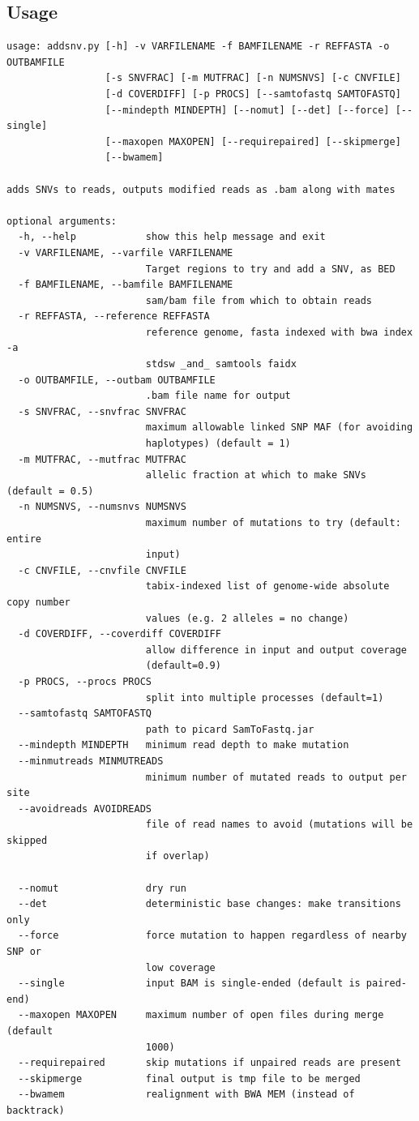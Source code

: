 \documentclass[letterpaper,11pt]{article}
\begin{document}
\subsection{Usage}
\begin{verbatim}
usage: addsnv.py [-h] -v VARFILENAME -f BAMFILENAME -r REFFASTA -o OUTBAMFILE
                 [-s SNVFRAC] [-m MUTFRAC] [-n NUMSNVS] [-c CNVFILE]
                 [-d COVERDIFF] [-p PROCS] [--samtofastq SAMTOFASTQ]
                 [--mindepth MINDEPTH] [--nomut] [--det] [--force] [--single]
                 [--maxopen MAXOPEN] [--requirepaired] [--skipmerge]
                 [--bwamem]

adds SNVs to reads, outputs modified reads as .bam along with mates

optional arguments:
  -h, --help            show this help message and exit
  -v VARFILENAME, --varfile VARFILENAME
                        Target regions to try and add a SNV, as BED
  -f BAMFILENAME, --bamfile BAMFILENAME
                        sam/bam file from which to obtain reads
  -r REFFASTA, --reference REFFASTA
                        reference genome, fasta indexed with bwa index -a
                        stdsw _and_ samtools faidx
  -o OUTBAMFILE, --outbam OUTBAMFILE
                        .bam file name for output
  -s SNVFRAC, --snvfrac SNVFRAC
                        maximum allowable linked SNP MAF (for avoiding
                        haplotypes) (default = 1)
  -m MUTFRAC, --mutfrac MUTFRAC
                        allelic fraction at which to make SNVs (default = 0.5)
  -n NUMSNVS, --numsnvs NUMSNVS
                        maximum number of mutations to try (default: entire
                        input)
  -c CNVFILE, --cnvfile CNVFILE
                        tabix-indexed list of genome-wide absolute copy number
                        values (e.g. 2 alleles = no change)
  -d COVERDIFF, --coverdiff COVERDIFF
                        allow difference in input and output coverage
                        (default=0.9)
  -p PROCS, --procs PROCS
                        split into multiple processes (default=1)
  --samtofastq SAMTOFASTQ
                        path to picard SamToFastq.jar
  --mindepth MINDEPTH   minimum read depth to make mutation
  --minmutreads MINMUTREADS
                        minimum number of mutated reads to output per site
  --avoidreads AVOIDREADS
                        file of read names to avoid (mutations will be skipped
                        if overlap)

  --nomut               dry run
  --det                 deterministic base changes: make transitions only
  --force               force mutation to happen regardless of nearby SNP or
                        low coverage
  --single              input BAM is single-ended (default is paired-end)
  --maxopen MAXOPEN     maximum number of open files during merge (default
                        1000)
  --requirepaired       skip mutations if unpaired reads are present
  --skipmerge           final output is tmp file to be merged
  --bwamem              realignment with BWA MEM (instead of backtrack)

\end{verbatim}
\end{document}
